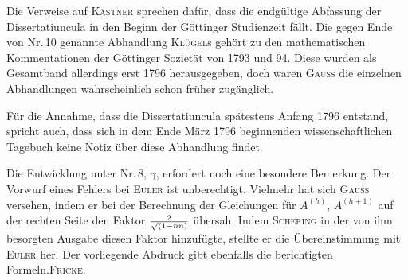 Die Verweise auf \textsc{Kästner} sprechen dafür, dass die endgültige Abfassung der Dissertatiuncula in den Beginn der Göttinger Studienzeit fällt. Die gegen Ende von Nr.\,10 genannte Abhandlung \textsc{Klügel}s gehört zu den mathematischen Kommentationen der Göttinger Sozietät von 1793 und 94. Diese wurden als Gesamtband allerdings erst 1796 herausgegeben, doch waren \textsc{Gauss} die einzelnen Abhandlungen wahrscheinlich schon früher zugänglich.

Für die Annahme, dass die Dissertatiuncula spätestens Anfang 1796 entstand, spricht auch, dass sich in dem Ende März 1796 beginnenden wissenschaftlichen Tagebuch keine Notiz über diese Abhandlung findet.

Die Entwicklung unter Nr.\,8, $\gamma$, erfordert noch eine besondere Bemerkung. Der Vorwurf eines Fehlers bei \textsc{Euler} ist unberechtigt. Vielmehr hat sich \textsc{Gauss} versehen, indem er bei der Berechnung der Gleichungen für $A^{(h)}$, $A^{(h+1)}$ auf der rechten Seite den Faktor $\frac{2}{\mathord{\surd}(1-nn)}$ übersah. Indem \textsc{Schering} in der von ihm besorgten Ausgabe diesen Faktor hinzufügte, stellte er die Übereinstimmung mit \textsc{Euler} her. Der vorliegende Abdruck gibt ebenfalls die berichtigten Formeln.\hfill\textsc{Fricke}.

\par\smallskip\hrulefill\smallskip\par

